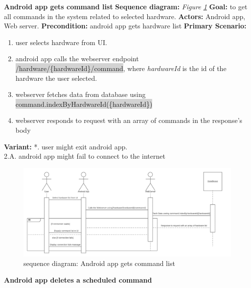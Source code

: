 \documentclass[12pt, oneside, a4paper]{book}
\newcommand{\code}[1]{{\color{red}\colorbox{lightgray}{#1}}}
\newcommand\boldcolor[1]{\textcolor{bold}{\textbf{#1}}}
\begin{document}
				\newpage\hspace*{-6mm}\boldcolor{Android app gets command list}
				\newline\textbf{Sequence diagram:} \textit{Figure \ref{android_command_list}}
				\newline\textbf{Goal:} to get all commands in the system related to selected hardware.
				\newline\textbf{Actors:} Android app, Web server.
				\newline\textbf{Precondition:} android app gets hardware list
				\newline\textbf{Primary Scenario:}	
				\begin{enumerate}[label*=\arabic*.]
					\item user selects hardware from UI.
					\item android app calls the webserver endpoint \code{/hardware/\{hardwareId\}/command}, where \textit{hardwareId} is the id of the hardware the user selected.
					\item webserver fetches data from database using \code{command.indexByHardwareId(\{hardwareId\})}
					\item webserver responds to request with an array of commands in the response's body
				\end{enumerate}
				\textbf{Variant:}\newline
				\hspace*{5mm}*. user might exit android app. \\
				\hspace*{5mm}2.A. android app might fail to connect to the internet \\
				\begin{figure}[H]
					\includegraphics[width=\linewidth]{img/sequence_android_command_list.png}
					\caption{sequence diagram: Android app gets command list}
					\label{android_command_list}
				\end{figure}
				\newpage\hspace*{-6mm}\boldcolor{Android app deletes a scheduled command}
\end{document}
